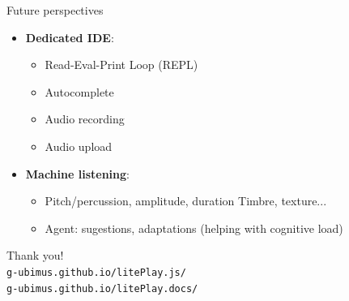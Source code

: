 \documentclass[10pt]{beamer}
\begin{document}
\begin{frame}{Future perspectives}
\begin{block}{}
        \begin{itemize}
		\item \textbf{Dedicated IDE}: 
			\begin{itemize}
				\item {} Read-Eval-Print Loop (REPL)
				\item {} Autocomplete
				\item {} Audio recording
				\item {} Audio upload
			\end{itemize}
		\item \textbf{Machine listening}:
			\begin{itemize}
				\item {} Pitch/percussion, amplitude, duration  Timbre, texture...
				\item {} Agent: sugestions, adaptations (helping with cognitive load)
			\end{itemize}

        \end{itemize}
    \end{block}
\end{frame}

\begin{frame}
    \centering
    \Huge Thank you! \\
    \vspace{1cm}
    \normalsize \texttt{g-ubimus.github.io/litePlay.js/}
    \\
    \normalsize \texttt{g-ubimus.github.io/litePlay.docs/}
\end{frame}
\end{document}
